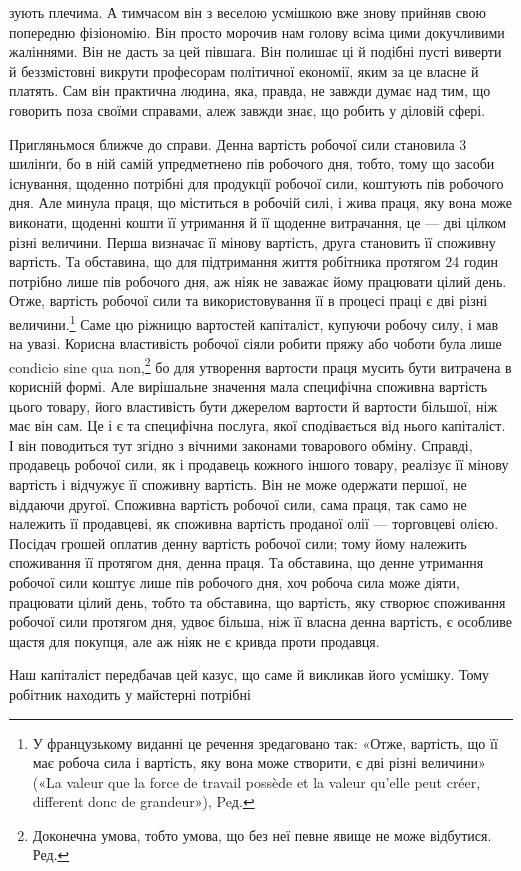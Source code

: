 зують плечима. А тимчасом він з веселою усмішкою вже знову прийняв
свою попередню фізіономію. Він просто морочив нам голову
всіма цими докучливими жаліннями. Він не дасть за цей півшага.
Він полишає ці й подібні пусті виверти й беззмістовні викрути
професорам політичної економії, яким за це власне й платять.
Сам він практична людина, яка, правда, не завжди думає над тим,
що говорить поза своїми справами, алеж завжди знає, що робить
у діловій сфері.

Пригляньмося ближче до справи. Денна вартість робочої
сили становила 3 шилінґи, бо в ній самій упредметнено пів робочого
дня, тобто, тому що засоби існування, щоденно потрібні
для продукції робочої сили, коштують пів робочого дня. Але
минула праця, що міститься в робочій силі, і жива праця, яку
вона може виконати, щоденні кошти її утримання й її щоденне
витрачання, це — дві цілком різні величини. Перша визначає
її мінову вартість, друга становить її споживну вартість. Та
обставина, що для підтримання життя робітника протягом 24 годин
потрібно лише пів робочого дня, аж ніяк не заважає йому
працювати цілий день. Отже, вартість робочої сили та використовування
її в процесі праці є дві різні величини.\footnote*{
У французькому виданні це речення зредаговано так: «Отже, вартість,
що її має робоча сила і вартість, яку вона може створити, є дві різні
величини» («La valeur que la force de travail possède et la valeur qu’elle
peut créer, different donc de grandeur»), Peд.
} Саме цю
ріжницю вартостей капіталіст, купуючи робочу силу, і мав на
увазі. Корисна властивість робочої сіяли робити пряжу або чоботи
була лише condicio sine qua non,\footnote*{
Доконечна умова, тобто умова, що без неї певне явище не може відбутися.
Ред.
} бо для утворення вартости
праця мусить бути витрачена в корисній формі. Але вирішальне
значення мала специфічна споживна вартість цього товару, його
властивість бути джерелом вартости й вартости більшої, ніж має
він сам. Це і є та специфічна послуга, якої сподівається від нього
капіталіст. І він поводиться тут згідно з вічними законами товарового
обміну. Справді, продавець робочої сили, як і продавець
кожного іншого товару, реалізує її мінову вартість і відчужує її
споживну вартість. Він не може одержати першої, не віддаючи
другої. Споживна вартість робочої сили, сама праця, так само
не належить її продавцеві, як споживна вартість проданої олії —
торговцеві олією. Посідач грошей оплатив денну вартість робочої
сили; тому йому належить споживання її протягом дня, денна
праця. Та обставина, що денне утримання робочої сили коштує
лише пів робочого дня, хоч робоча сила може діяти, працювати
цілий день, тобто та обставина, що вартість, яку створює споживання
робочої сили протягом дня, удвоє більша, ніж її власна
денна вартість, є особливе щастя для покупця, але аж ніяк не
є кривда проти продавця.

Наш капіталіст передбачав цей казус, що саме й викликав
його усмішку. Тому робітник находить у майстерні потрібні